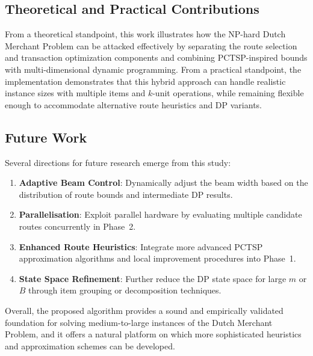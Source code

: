 \documentclass[12pt]{article}
\begin{document}
\subsection{Theoretical and Practical Contributions}

From a theoretical standpoint, this work illustrates how the NP-hard Dutch Merchant Problem \cite{reduccion2025} can be attacked effectively by separating the route selection and transaction optimization components and combining PCTSP-inspired bounds with multi-dimensional dynamic programming. From a practical standpoint, the implementation demonstrates that this hybrid approach can handle realistic instance sizes with multiple items and $k$-unit operations, while remaining flexible enough to accommodate alternative route heuristics and DP variants.

\subsection{Future Work}

Several directions for future research emerge from this study:

\begin{enumerate}
    \item \textbf{Adaptive Beam Control}: Dynamically adjust the beam width based on the distribution of route bounds and intermediate DP results.
    \item \textbf{Parallelisation}: Exploit parallel hardware by evaluating multiple candidate routes concurrently in Phase~2.
    \item \textbf{Enhanced Route Heuristics}: Integrate more advanced PCTSP approximation algorithms and local improvement procedures into Phase~1.
    \item \textbf{State Space Refinement}: Further reduce the DP state space for large $m$ or $B$ through item grouping or decomposition techniques.
\end{enumerate}

Overall, the proposed algorithm provides a sound and empirically validated foundation for solving medium-to-large instances of the Dutch Merchant Problem, and it offers a natural platform on which more sophisticated heuristics and approximation schemes can be developed.



\end{document}
